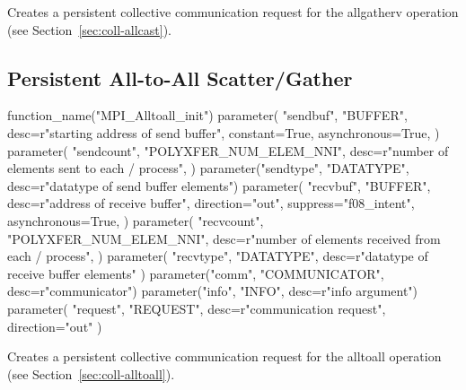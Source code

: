 Creates a persistent collective communication request for the allgatherv operation
(see Section~\ref{sec:coll-allcast}).

\subsection{Persistent All-to-All Scatter/Gather}
\label{sec:pcoll-alltoall}

\begin{mpi-binding}
    function_name("MPI_Alltoall_init")
    parameter(
        "sendbuf",
        "BUFFER",
        desc=r"starting address of send buffer",
        constant=True,
        asynchronous=True,
    )
    parameter(
        "sendcount",
        "POLYXFER_NUM_ELEM_NNI",
        desc=r"number of elements sent to each \MPI/ process",
    )
    parameter("sendtype", "DATATYPE", desc=r"datatype of send buffer elements")
    parameter(
        "recvbuf",
        "BUFFER",
        desc=r"address of receive buffer",
        direction="out",
        suppress="f08_intent",
        asynchronous=True,
    )
    parameter(
        "recvcount",
        "POLYXFER_NUM_ELEM_NNI",
        desc=r"number of elements received from each \MPI/ process",
    )
    parameter(
        "recvtype", "DATATYPE", desc=r"datatype of receive buffer elements"
    )
    parameter("comm", "COMMUNICATOR", desc=r"communicator")
    parameter("info", "INFO", desc=r"info argument")
    parameter(
        "request", "REQUEST", desc=r"communication request", direction="out"
    )
\end{mpi-binding}

Creates a persistent collective communication request for the alltoall operation
(see Section~\ref{sec:coll-alltoall}).

